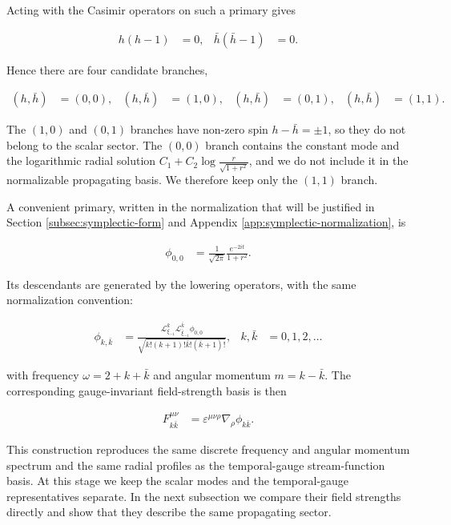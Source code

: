 Acting with the Casimir operators on such a primary gives

\begin{align}
h(h-1)&=0, &
\bar{h}(\bar{h}-1)&=0.
\end{align}

Hence there are four candidate branches,

\begin{align}
(h,\bar{h})&=(0,0), &
(h,\bar{h})&=(1,0), &
(h,\bar{h})&=(0,1), &
(h,\bar{h})&=(1,1).
\end{align}

The $(1,0)$ and $(0,1)$ branches have non-zero spin $h-\bar{h}=\pm1$, so they do not belong to the scalar sector. The $(0,0)$ branch contains the constant mode and the logarithmic radial solution $C_{1}+C_{2}\log\frac{r}{\sqrt{1+r^{2}}}$, and we do not include it in the normalizable propagating basis. We therefore keep only the $(1,1)$ branch.

A convenient primary, written in the normalization that will be justified in Section \ref{subsec:symplectic-form} and Appendix \ref{app:symplectic-normalization}, is

\begin{align}
\phi_{0,0}&=\frac{1}{\sqrt{2\pi}}\frac{e^{-2it}}{1+r^{2}}.
\end{align}

Its descendants are generated by the lowering operators, with the same normalization convention:

\begin{align}
\phi_{k,\bar{k}}&=\frac{\mathcal{L}_{\xi_{-1}}^{k}\mathcal{L}_{\bar{\xi}_{-1}}^{\bar{k}}\phi_{0,0}}{\sqrt{k!(k+1)!\bar{k}!(\bar{k}+1)!}}, &
k,\bar{k}&=0,1,2,\ldots
\end{align}

with frequency $\displaystyle{\omega=2+k+\bar{k}}$ and angular momentum $\displaystyle{m=k-\bar{k}}$. The corresponding gauge-invariant field-strength basis is then

\begin{align}
F_{k\bar{k}}^{\mu\nu}&=\varepsilon^{\mu\nu\rho}\nabla_{\rho}\phi_{k\bar{k}}.
\end{align}

This construction reproduces the same discrete frequency and angular momentum spectrum and the same radial profiles as the temporal-gauge stream-function basis. At this stage we keep the scalar modes and the temporal-gauge representatives separate. In the next subsection we compare their field strengths directly and show that they describe the same propagating sector.


